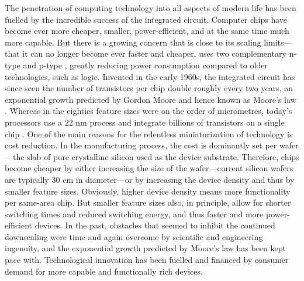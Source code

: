 The penetration of computing technology into all aspects of modern life has been
fuelled by the incredible success of the  integrated circuit.
Computer chips have become ever more cheaper, smaller, power-efficient, and at
the same time much more capable. But there is a growing concern that 
is close to its scaling limits---that it can no longer become ever faster and
cheaper.  uses two complementary n-type and p-type ,
greatly reducing power consumption compared to older technologies, such as
 logic.  Invented in the early 1960s, the  integrated
circuit has since seen the number of transistors per chip double roughly every
two years, an exponential growth predicted by Gordon Moore and hence known as
Moore's law \cite{moore1965cramming}. Whereas in the eighties feature sizes were
on the order of micrometres, today's processors use a 22 nm process and
integrate billions of transistors on a single chip \cite{bohr2011evolution}. One
of the main reasons for the relentless miniaturization of  technology
is cost reduction. In the manufacturing process, the cost is dominantly set per
wafer---the slab of pure crystalline silicon used as the device substrate.
Therefore, chips become cheaper by either increasing the size of the
wafer---current silicon wafers are typically 30 cm in diameter---or by
increasing the device density and thus by smaller feature sizes. Obviously,
higher device density means more functionality per same-area chip. But smaller
feature sizes also, in principle, allow for shorter switching times and reduced
switching energy, and thus faster and more power-efficient devices. In the past,
obstacles that seemed to inhibit the continued downscaling were time and again
overcome by scientific and engineering ingenuity, and the exponential growth
predicted by Moore's law has been kept pace with.  Technological innovation has
been fuelled and financed by consumer demand for more capable and functionally
rich devices.

